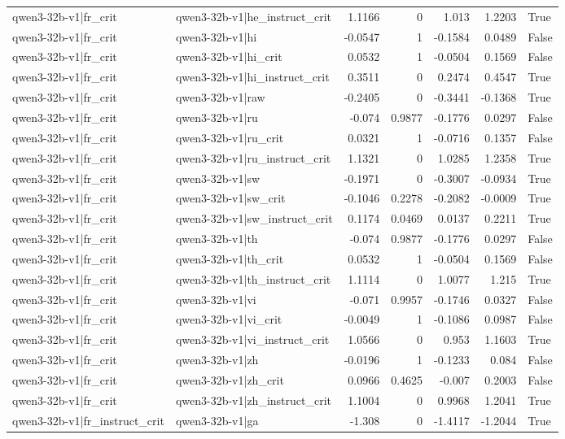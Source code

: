 \begin{table}
\begin{tabular}{l l r r r r l}
qwen3-32b-v1|fr_crit & qwen3-32b-v1|he_instruct_crit & 1.1166 & 0 & 1.013 & 1.2203 & True \\
qwen3-32b-v1|fr_crit & qwen3-32b-v1|hi & -0.0547 & 1 & -0.1584 & 0.0489 & False \\
qwen3-32b-v1|fr_crit & qwen3-32b-v1|hi_crit & 0.0532 & 1 & -0.0504 & 0.1569 & False \\
qwen3-32b-v1|fr_crit & qwen3-32b-v1|hi_instruct_crit & 0.3511 & 0 & 0.2474 & 0.4547 & True \\
qwen3-32b-v1|fr_crit & qwen3-32b-v1|raw & -0.2405 & 0 & -0.3441 & -0.1368 & True \\
qwen3-32b-v1|fr_crit & qwen3-32b-v1|ru & -0.074 & 0.9877 & -0.1776 & 0.0297 & False \\
qwen3-32b-v1|fr_crit & qwen3-32b-v1|ru_crit & 0.0321 & 1 & -0.0716 & 0.1357 & False \\
qwen3-32b-v1|fr_crit & qwen3-32b-v1|ru_instruct_crit & 1.1321 & 0 & 1.0285 & 1.2358 & True \\
qwen3-32b-v1|fr_crit & qwen3-32b-v1|sw & -0.1971 & 0 & -0.3007 & -0.0934 & True \\
qwen3-32b-v1|fr_crit & qwen3-32b-v1|sw_crit & -0.1046 & 0.2278 & -0.2082 & -0.0009 & True \\
qwen3-32b-v1|fr_crit & qwen3-32b-v1|sw_instruct_crit & 0.1174 & 0.0469 & 0.0137 & 0.2211 & True \\
qwen3-32b-v1|fr_crit & qwen3-32b-v1|th & -0.074 & 0.9877 & -0.1776 & 0.0297 & False \\
qwen3-32b-v1|fr_crit & qwen3-32b-v1|th_crit & 0.0532 & 1 & -0.0504 & 0.1569 & False \\
qwen3-32b-v1|fr_crit & qwen3-32b-v1|th_instruct_crit & 1.1114 & 0 & 1.0077 & 1.215 & True \\
qwen3-32b-v1|fr_crit & qwen3-32b-v1|vi & -0.071 & 0.9957 & -0.1746 & 0.0327 & False \\
qwen3-32b-v1|fr_crit & qwen3-32b-v1|vi_crit & -0.0049 & 1 & -0.1086 & 0.0987 & False \\
qwen3-32b-v1|fr_crit & qwen3-32b-v1|vi_instruct_crit & 1.0566 & 0 & 0.953 & 1.1603 & True \\
qwen3-32b-v1|fr_crit & qwen3-32b-v1|zh & -0.0196 & 1 & -0.1233 & 0.084 & False \\
qwen3-32b-v1|fr_crit & qwen3-32b-v1|zh_crit & 0.0966 & 0.4625 & -0.007 & 0.2003 & False \\
qwen3-32b-v1|fr_crit & qwen3-32b-v1|zh_instruct_crit & 1.1004 & 0 & 0.9968 & 1.2041 & True \\
qwen3-32b-v1|fr_instruct_crit & qwen3-32b-v1|ga & -1.308 & 0 & -1.4117 & -1.2044 & True \\

\end{tabular}
\end{table}
